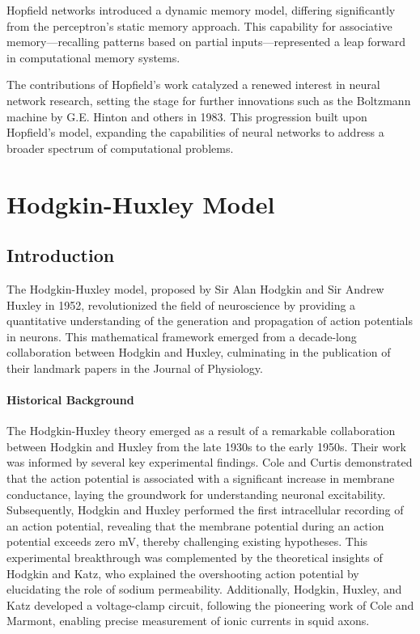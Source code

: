 \documentclass[12pt,a4paper]{report}
\begin{document}
Hopfield networks introduced a dynamic memory model, differing significantly from the perceptron's static memory approach. This capability for associative memory—recalling patterns based on partial inputs—represented a leap forward in computational memory systems.

The contributions of Hopfield's work catalyzed a renewed interest in neural network research, setting the stage for further innovations such as the Boltzmann machine by G.E. Hinton and others in 1983. This progression built upon Hopfield's model, expanding the capabilities of neural networks to address a broader spectrum of computational problems.


\chapter{Hodgkin-Huxley Model}

\section{Introduction}

The Hodgkin-Huxley model, proposed by Sir Alan Hodgkin and Sir Andrew Huxley in 1952, revolutionized the field of neuroscience by providing a quantitative understanding of the generation and propagation of action potentials in neurons. This mathematical framework emerged from a decade-long collaboration between Hodgkin and Huxley, culminating in the publication of their landmark papers in the Journal of Physiology.

\subsubsection{Historical Background}

The Hodgkin-Huxley theory emerged as a result of a remarkable collaboration between Hodgkin and Huxley from the late 1930s to the early 1950s. Their work was informed by several key experimental findings. Cole and Curtis demonstrated that the action potential is associated with a significant increase in membrane conductance, laying the groundwork for understanding neuronal excitability\cite{Cole1939}. Subsequently, Hodgkin and Huxley performed the first intracellular recording of an action potential, revealing that the membrane potential during an action potential exceeds zero mV, thereby challenging existing hypotheses\cite{Hodgkin1939}. This experimental breakthrough was complemented by the theoretical insights of Hodgkin and Katz, who explained the overshooting action potential by elucidating the role of sodium permeability\cite{Hodgkin1949}. Additionally, Hodgkin, Huxley, and Katz developed a voltage-clamp circuit, following the pioneering work of Cole and Marmont, enabling precise measurement of ionic currents in squid axons\cite{Hausser2000}.
\end{document}
